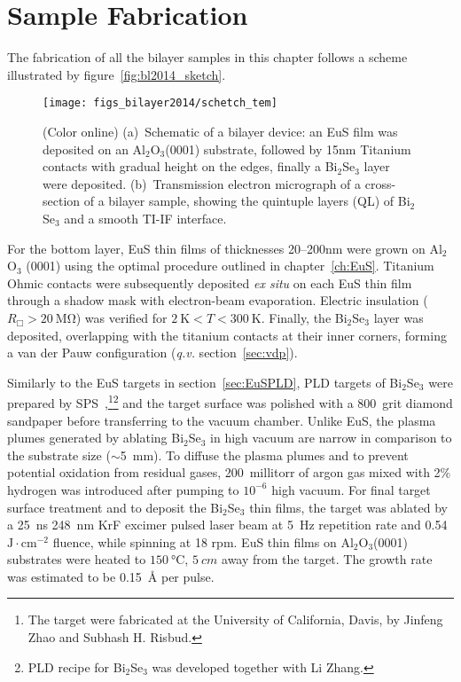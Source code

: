 \section{Sample Fabrication}\label{sec:bilayer2014_char}
The fabrication of all the bilayer samples in this chapter follows a scheme illustrated by figure~\ref{fig:bl2014_sketch}.%
\begin{figure}[h]%
    \centering%
    \subfloat{\label{fig:bl2014_sketch}}%
    \subfloat{\label{fig:bl2014_TEM}}%
    \texttt{[image: figs\_bilayer2014/schetch\_tem]}%
    \caption[Schematic and cross-section micrograph of Bi$_2$Se$_3$--EuS thin film bilayers]{(Color online) (a)~Schematic of a bilayer device: an EuS film was deposited on an Al$_2$O$_3$(0001) substrate, followed by 15nm Titanium contacts with gradual height on the edges, finally a Bi$_2$Se$_3$ layer were deposited. (b)~Transmission electron micrograph of a cross-section of a bilayer sample, showing the quintuple layers (QL) of Bi$_2$Se$_3$ and a smooth TI-IF interface.}%
\end{figure} %
%
For the bottom layer, EuS thin films of thicknesses 20--200nm were grown on Al$_2$O$_3$ (0001) using the optimal procedure outlined in chapter~\ref{ch:EuS}. Titanium Ohmic contacts were subsequently deposited \textit{ex situ} on each EuS thin film through a shadow mask with electron-beam evaporation. Electric insulation ($R_\Box > 20~\mathrm{M\Omega}$) was verified for $2~\mathrm{K}<T<300~\mathrm{K}$. Finally, the Bi$_2$Se$_3$ layer was deposited, overlapping with the titanium contacts at their inner corners, forming a van der Pauw configuration (\textit{q.v.} section~\ref{sec:vdp}).

Similarly to the EuS targets in section~\ref{sec:EuSPLD}, PLD targets of Bi$_2$Se$_3$ were prepared by SPS~\cite{Jinfeng2, Subhash1},\footnote{The target were fabricated at the University of California, Davis, by Jinfeng Zhao and Subhash H. Risbud.}\footnote{PLD recipe for Bi$_2$Se$_3$ was developed together with Li Zhang.} and the target surface was polished with a 800~grit diamond sandpaper before transferring to the vacuum chamber. Unlike EuS, the plasma plumes generated by ablating Bi$_2$Se$_3$ in high vacuum are narrow in comparison to the substrate size ($\sim$5~mm). To diffuse the plasma plumes and to prevent potential oxidation from residual gases, 200~millitorr of argon gas mixed with 2\% hydrogen was introduced after pumping to $10^{-6}$ high vacuum. For final target surface treatment and to deposit the Bi$_2$Se$_3$ thin films, the target was ablated by a 25~ns 248~nm KrF excimer pulsed laser beam at 5~Hz repetition rate and 0.54~$\mathrm{J\cdot{}cm^{-2}}$ fluence, while spinning at 18 rpm. EuS thin films on Al$_2$O$_3$(0001) substrates were heated to $\SI{150}{\degreeCelsius}$, $\SI{5}{cm}$ away from the target. The growth rate was estimated to be 0.15~\AA{} per pulse.

